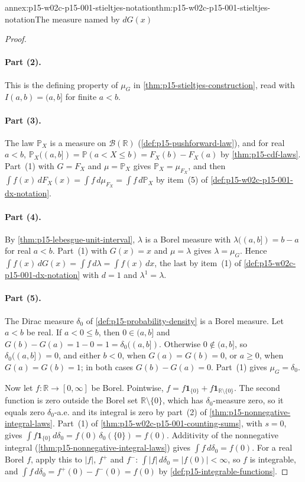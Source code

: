 \begin{annexitem}{annex:p15-w02c-p15-001-stieltjes-notation}{thm:p15-w02c-p15-001-stieltjes-notation}{The measure named by \(dG(x)\)}
\begin{proof}
\paragraph{Part (2).}
This is the defining property of \(\mu_G\) in
\cref{thm:p15-stieltjes-construction}, read with \(I(a,b)=(a,b]\) for
finite \(a<b\).

\paragraph{Part (3).}
The law \(\mathbb P_X\) is a measure on \(\mathcal B(\mathbb R)\)
(\cref{def:p15-pushforward-law}), and for real \(a<b\),
\(\mathbb P_X((a,b])=\mathbb P(a<X\leq b)=F_X(b)-F_X(a)\) by
\cref{thm:p15-cdf-laws}. Part~(1) with \(G=F_X\) and \(\mu=\mathbb P_X\)
gives \(\mathbb P_X=\mu_{F_X}\), and then
\(\int f(x)\,dF_X(x)=\int f\,d\mu_{F_X}=\int f\,d\mathbb P_X\) by
item~(5) of \cref{def:p15-w02c-p15-001-dx-notation}.

\paragraph{Part (4).}
By \cref{thm:p15-lebesgue-unit-interval}, \(\lambda\) is a Borel measure
with \(\lambda((a,b])=b-a\) for real \(a<b\). Part~(1) with
\(G(x)=x\) and \(\mu=\lambda\) gives \(\lambda=\mu_G\). Hence
\(\int f(x)\,dG(x)=\int f\,d\lambda=\int f(x)\,dx\), the last by item~(1)
of \cref{def:p15-w02c-p15-001-dx-notation} with \(d=1\) and
\(\lambda^1=\lambda\).

\paragraph{Part (5).}
The Dirac measure \(\delta_0\) of \cref{def:p15-probability-density} is a
Borel measure. Let \(a<b\) be real. If \(a<0\leq b\), then
\(0\in(a,b]\) and \(G(b)-G(a)=1-0=1=\delta_0((a,b])\). Otherwise
\(0\notin(a,b]\), so \(\delta_0((a,b])=0\), and either \(b<0\), when
\(G(a)=G(b)=0\), or \(a\geq0\), when \(G(a)=G(b)=1\); in both cases
\(G(b)-G(a)=0\). Part~(1) gives \(\mu_G=\delta_0\).

Now let \(f:\mathbb R\to[0,\infty]\) be Borel. Pointwise,
\(f=f\mathbf1_{\{0\}}+f\mathbf1_{\mathbb R\setminus\{0\}}\). The second
function is zero outside the Borel set \(\mathbb R\setminus\{0\}\), which
has \(\delta_0\)-measure zero, so it equals zero \(\delta_0\)-a.e. and its
integral is zero by part~(2) of \cref{thm:p15-nonnegative-integral-laws}.
Part~(1) of \cref{thm:p15-w02c-p15-001-counting-sums}, with \(s=0\),
gives \(\int f\mathbf1_{\{0\}}\,d\delta_0=f(0)\,\delta_0(\{0\})=f(0)\).
Additivity of the nonnegative integral
(\cref{thm:p15-nonnegative-integral-laws}) gives
\(\int f\,d\delta_0=f(0)\). For a real Borel \(f\), apply this to
\(|f|\), \(f^+\) and \(f^-\): \(\int|f|\,d\delta_0=|f(0)|<\infty\), so
\(f\) is integrable, and
\(\int f\,d\delta_0=f^+(0)-f^-(0)=f(0)\) by
\cref{def:p15-integrable-functions}.
\end{proof}
\end{annexitem}

